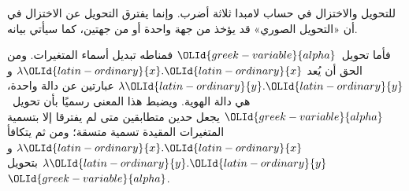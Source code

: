 \documentclass[../../../include/open-logic-section]{subfiles}
\begin{document}

للتحويل والاختزال في حساب لامبدا ثلاثة أضرب. وإنما يفترق التحويل عن
الاختزال في أن «التحويل الصوري» قد يؤخذ من جهة واحدة أو من جهتين، كما
سيأتي بيانه.

فأما تحويل~${\OLId{greek-variable}{alpha}}$ فمناطه تبديل أسماء المتغيرات. ومن الحق أن يُعد
$\lambda {\OLId{latin-ordinary}{x}}. {\OLId{latin-ordinary}{x}}$ و$\lambda {\OLId{latin-ordinary}{y}}.{\OLId{latin-ordinary}{y}}$ عبارتين عن دالة واحدة، هي دالة الهوية.
ويضبط هذا المعنى رسميًا بأن تحويل~${\OLId{greek-variable}{alpha}}$ يجعل حدين متطابقين متى لم
يفترقا إلا بتسمية المتغيرات المقيدة تسمية متسقة؛ ومن ثم يتكافأ
$\lambda {\OLId{latin-ordinary}{x}}.{\OLId{latin-ordinary}{x}}$ و$\lambda {\OLId{latin-ordinary}{y}}.{\OLId{latin-ordinary}{y}}$ بتحويل~${\OLId{greek-variable}{alpha}}$.
\end{document}
